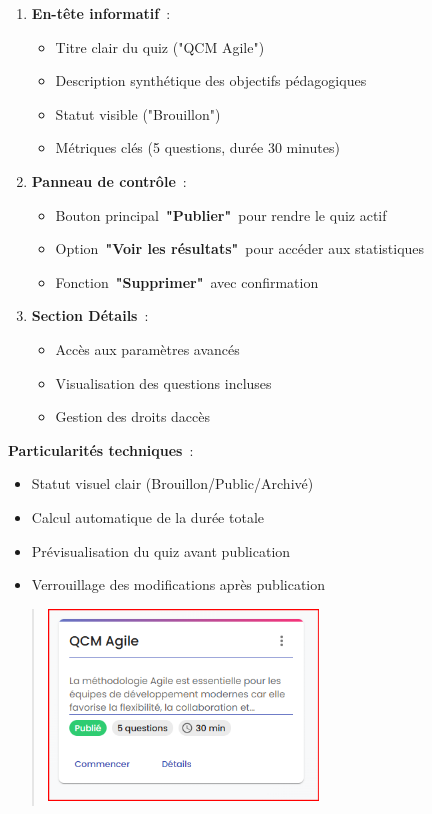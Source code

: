 \documentclass[12pt,a4paper,twoside]{report}
\begin{document}
\begin{enumerate}
\def\labelenumi{\arabic{enumi}.}
\item
  \textbf{En-tête informatif}~:

  \begin{itemize}
  \item
    Titre clair du quiz ("QCM Agile")
  \item
    Description synthétique des objectifs pédagogiques
  \item
    Statut visible ("Brouillon")
  \item
    Métriques clés (5 questions, durée 30 minutes)
  \end{itemize}
\item
  \textbf{Panneau de contrôle}~:

  \begin{itemize}
  \item
    Bouton principal~\textbf{"Publier"}~pour rendre le quiz actif
  \item
    Option~\textbf{"Voir les résultats"}~pour accéder aux statistiques
  \item
    Fonction~\textbf{"Supprimer"}~avec confirmation
  \end{itemize}
\item
  \textbf{Section Détails}~:

  \begin{itemize}
  \item
    Accès aux paramètres avancés
  \item
    Visualisation des questions incluses
  \item
    Gestion des droits d\textquotesingle accès
  \end{itemize}
\end{enumerate}

\textbf{Particularités techniques}~:

\begin{itemize}
\item
  Statut visuel clair (Brouillon/Public/Archivé)
\item
  Calcul automatique de la durée totale
\item
  Prévisualisation du quiz avant publication
\item
  Verrouillage des modifications après publication
\end{itemize}

\begin{quote}
\includegraphics[width=2.82639in,height=2.00694in]{latex_media/media/image58.png}
\end{quote}
\end{document}
